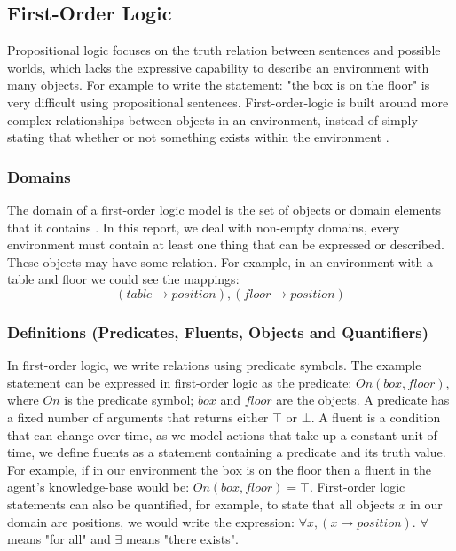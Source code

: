 \subsection{First-Order Logic}
Propositional logic focuses on the truth relation between sentences and possible worlds, which lacks the expressive capability to describe an environment with many objects. \cite[Chapter 8]{russell2016artificial} For example to write the statement: "the box is on the floor" is very difficult using propositional sentences. First-order-logic is built around more complex relationships between objects in an environment, instead of simply stating that whether or not something exists within the environment \cite[Chapter 8]{russell2016artificial}.

\subsubsection{Domains}
The domain of a first-order logic model is the set of objects or domain elements that it contains \cite[Chapter 8]{russell2016artificial}. In this report, we deal with non-empty domains, every environment must contain at least one thing that can be expressed or described. These objects may have some relation. For example, in an environment with a table and floor we could see the mappings: \[(table \rightarrow position), (floor \rightarrow position)\]

\subsubsection{Definitions (Predicates, Fluents, Objects and Quantifiers)}
In first-order logic, we write relations using predicate symbols. The example statement can be expressed in first-order logic as the predicate: $On(box, floor)$, where $On$ is the predicate symbol; $box$ and $floor$ are the objects. A predicate has a fixed number of arguments that returns either $\top$ or $\bot$. A fluent is a condition that can change over time, as we model actions that take up a constant unit of time, we define fluents as a statement containing a predicate and its truth value. For example, if in our environment the box is on the floor then a fluent in the agent's knowledge-base would be: $On(box, floor) = \top$. First-order logic statements can also be quantified, for example, to state that all objects $x$ in our domain are positions, we would write the expression: $\forall x, (x \rightarrow position)$.  $\forall$ means "for all" and $\exists$ means "there exists". \cite[Chapter 8]{russell2016artificial}

